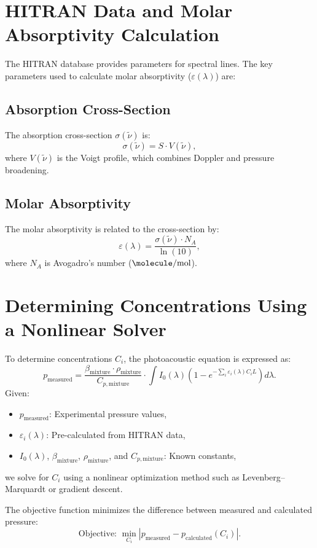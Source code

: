 \documentclass[12pt]{article}
\begin{document}
\section{HITRAN Data and Molar Absorptivity Calculation}
The HITRAN database provides parameters for spectral lines. The key parameters used to calculate molar absorptivity (\( \varepsilon(\lambda) \)) are:

\subsection{Absorption Cross-Section}
The absorption cross-section \( \sigma(\tilde{\nu}) \) is:
\[
\sigma(\tilde{\nu}) = S \cdot V(\tilde{\nu}),
\]
where \( V(\tilde{\nu}) \) is the Voigt profile, which combines Doppler and pressure broadening.

\subsection{Molar Absorptivity}
The molar absorptivity is related to the cross-section by:
\[
\varepsilon(\lambda) = \frac{\sigma(\tilde{\nu}) \cdot N_A}{\ln(10)},
\]
where \( N_A \) is Avogadro's number (\(\si{\molecule\per\mole}\)).

\section{Determining Concentrations Using a Nonlinear Solver}
To determine concentrations \( C_i \), the photoacoustic equation is expressed as:
\[
p_{\text{measured}} = \frac{\beta_{\text{mixture}} \cdot \rho_{\text{mixture}}}{C_{p,\text{mixture}}} \cdot \int I_0(\lambda) \left( 1 - e^{-\sum_i \varepsilon_i(\lambda) C_i L} \right) d\lambda.
\]
Given:
\begin{itemize}
    \item \( p_{\text{measured}} \): Experimental pressure values,
    \item \( \varepsilon_i(\lambda) \): Pre-calculated from HITRAN data,
    \item \( I_0(\lambda) \), \( \beta_{\text{mixture}} \), \( \rho_{\text{mixture}} \), and \( C_{p,\text{mixture}} \): Known constants,
\end{itemize}
we solve for \( C_i \) using a nonlinear optimization method such as Levenberg–Marquardt or gradient descent.

The objective function minimizes the difference between measured and calculated pressure:
\[
\text{Objective: } \min_{C_i} \left| p_{\text{measured}} - p_{\text{calculated}}(C_i) \right|.
\]
\end{document}
